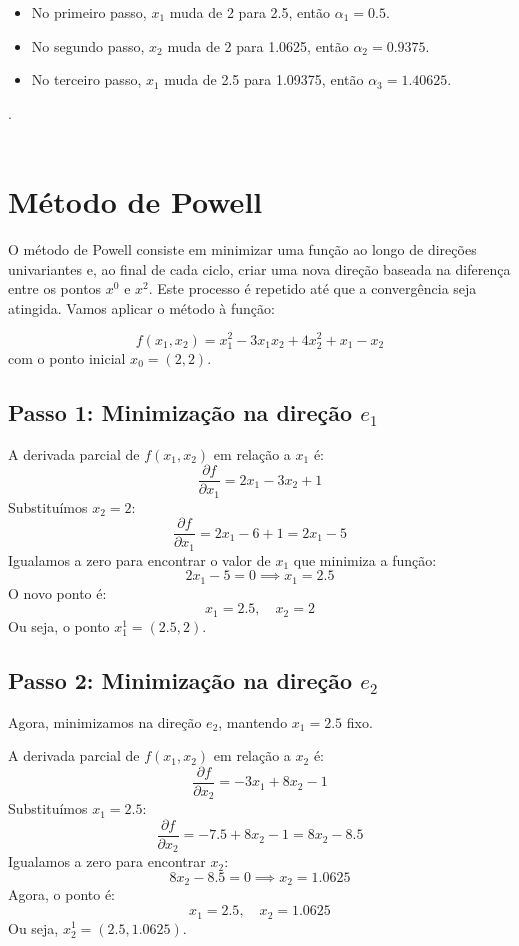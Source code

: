 \documentclass[a4paper, 12pt]{article}
\begin{document}
\begin{itemize}
    \item No primeiro passo, \( x_1 \) muda de 2 para 2.5, então \( \alpha_1 = 0.5 \).
    \item No segundo passo, \( x_2 \) muda de 2 para 1.0625, então \( \alpha_2 = 0.9375 \).
    \item No terceiro passo, \( x_1 \) muda de 2.5 para 1.09375, então \( \alpha_3 = 1.40625 \).
\end{itemize} 
.\\\\


\section{Método de Powell}
O método de Powell consiste em minimizar uma função ao longo de direções univariantes e, ao final de cada ciclo, criar uma nova direção baseada na diferença entre os pontos \(x^0\) e \(x^2\). Este processo é repetido até que a convergência seja atingida. Vamos aplicar o método à função:

\[
f(x_1, x_2) = x_1^2 - 3x_1x_2 + 4x_2^2 + x_1 - x_2
\]
com o ponto inicial \( x_0 = (2, 2) \).

\subsection{Passo 1: Minimização na direção \( e_1 \)}
A derivada parcial de \( f(x_1, x_2) \) em relação a \( x_1 \) é:
\[
\frac{\partial f}{\partial x_1} = 2x_1 - 3x_2 + 1
\]
Substituímos \( x_2 = 2 \):
\[
\frac{\partial f}{\partial x_1} = 2x_1 - 6 + 1 = 2x_1 - 5
\]
Igualamos a zero para encontrar o valor de \( x_1 \) que minimiza a função:
\[
2x_1 - 5 = 0 \implies x_1 = 2.5
\]
O novo ponto é:
\[
x_1 = 2.5, \quad x_2 = 2
\]
Ou seja, o ponto \( x_1^1 = (2.5, 2) \).

\subsection{Passo 2: Minimização na direção \( e_2 \)}
Agora, minimizamos na direção \( e_2 \), mantendo \( x_1 = 2.5 \) fixo.

A derivada parcial de \( f(x_1, x_2) \) em relação a \( x_2 \) é:
\[
\frac{\partial f}{\partial x_2} = -3x_1 + 8x_2 - 1
\]
Substituímos \( x_1 = 2.5 \):
\[
\frac{\partial f}{\partial x_2} = -7.5 + 8x_2 - 1 = 8x_2 - 8.5
\]
Igualamos a zero para encontrar \( x_2 \):
\[
8x_2 - 8.5 = 0 \implies x_2 = 1.0625
\]
Agora, o ponto é:
\[
x_1 = 2.5, \quad x_2 = 1.0625
\]
Ou seja, \( x_2^1 = (2.5, 1.0625) \).
\end{document}
